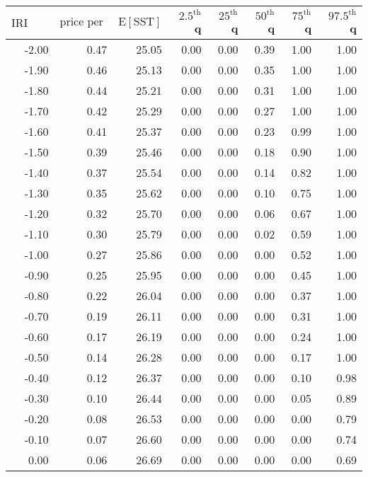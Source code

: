 \begin{table*}[ht]
\centering \footnotesize
\begin{tabular}{rrrrrrrr}
  \hline
$\mbox{IRI anom}$ & $\mbox{price per USD}$ & $\mbox{E}[\mbox{SST}]$ & $2.5^{\mbox{th}}$ q & $25^{\mbox{th}}$ q & $50^{\mbox{th}}$ q & $75^{\mbox{th}}$ q & $97.5^{\mbox{th}}$ q \\ 
  \hline
-2.00 & 0.47 & 25.05 & 0.00 & 0.00 & 0.39 & 1.00 & 1.00 \\ 
  -1.90 & 0.46 & 25.13 & 0.00 & 0.00 & 0.35 & 1.00 & 1.00 \\ 
  -1.80 & 0.44 & 25.21 & 0.00 & 0.00 & 0.31 & 1.00 & 1.00 \\ 
  -1.70 & 0.42 & 25.29 & 0.00 & 0.00 & 0.27 & 1.00 & 1.00 \\ 
  -1.60 & 0.41 & 25.37 & 0.00 & 0.00 & 0.23 & 0.99 & 1.00 \\ 
  -1.50 & 0.39 & 25.46 & 0.00 & 0.00 & 0.18 & 0.90 & 1.00 \\ 
  -1.40 & 0.37 & 25.54 & 0.00 & 0.00 & 0.14 & 0.82 & 1.00 \\ 
  -1.30 & 0.35 & 25.62 & 0.00 & 0.00 & 0.10 & 0.75 & 1.00 \\ 
  -1.20 & 0.32 & 25.70 & 0.00 & 0.00 & 0.06 & 0.67 & 1.00 \\ 
  -1.10 & 0.30 & 25.79 & 0.00 & 0.00 & 0.02 & 0.59 & 1.00 \\ 
  -1.00 & 0.27 & 25.86 & 0.00 & 0.00 & 0.00 & 0.52 & 1.00 \\ 
  -0.90 & 0.25 & 25.95 & 0.00 & 0.00 & 0.00 & 0.45 & 1.00 \\ 
  -0.80 & 0.22 & 26.04 & 0.00 & 0.00 & 0.00 & 0.37 & 1.00 \\ 
  -0.70 & 0.19 & 26.11 & 0.00 & 0.00 & 0.00 & 0.31 & 1.00 \\ 
  -0.60 & 0.17 & 26.19 & 0.00 & 0.00 & 0.00 & 0.24 & 1.00 \\ 
  -0.50 & 0.14 & 26.28 & 0.00 & 0.00 & 0.00 & 0.17 & 1.00 \\ 
  -0.40 & 0.12 & 26.37 & 0.00 & 0.00 & 0.00 & 0.10 & 0.98 \\ 
  -0.30 & 0.10 & 26.44 & 0.00 & 0.00 & 0.00 & 0.05 & 0.89 \\ 
  -0.20 & 0.08 & 26.53 & 0.00 & 0.00 & 0.00 & 0.00 & 0.79 \\ 
  -0.10 & 0.07 & 26.60 & 0.00 & 0.00 & 0.00 & 0.00 & 0.74 \\ 
  0.00 & 0.06 & 26.69 & 0.00 & 0.00 & 0.00 & 0.00 & 0.69 \\ 

\end{tabular}
\end{table*}
